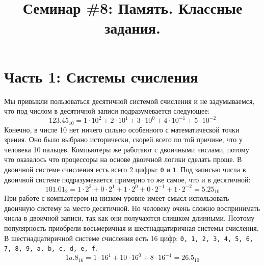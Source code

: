 \documentclass{article}
\begin{document}
\newpage

\title{Семинар \#8: Память. Классные задания.\vspace{-5ex}}\date{}\maketitle
\section*{Часть 1: Системы счисления}
Мы привыкли пользоваться десятичной системой счисления и не задумываемся, что под числом в десятичной записи подразумевается следующее:
$$
123.45_{10} = 1 \cdot 10^2 + 2 \cdot 10^1 + 3 \cdot 10^0 + 4 \cdot 10^{-1} + 5 \cdot 10^{-2}
$$
Конечно, в числе 10 нет ничего сильно особенного с математической точки зрения. Оно было выбрано исторически, скорей всего по той причине, что у человека 10 пальцев. Компьютеры же работают с двоичными числами, потому что оказалось что процессоры на основе двоичной логики сделать проще. В двоичной системе счисления есть всего 2 цифры: \texttt{0} и \texttt{1}. Под записью числа в двоичной системе подразумевается примерно то же самое, что и в десятичной:
$$
101.01_2 = 1 \cdot 2^2 + 0 \cdot 2^1 + 1 \cdot 2^0 + 0 \cdot 2^{-1} + 1 \cdot 2^{-2} = 5.25_{10}
$$
При работе с компьютером на низком уровне имеет смысл использовать двоичную систему за место десятичной.  Но человеку очень сложно воспринимать числа в двоичной записи, так как они получаются слишком длинными. Поэтому популярность приобрели восьмеричная и шестнадцатиричная системы счисления. В шестнадцатиричной системе счисления есть 16 цифр: \texttt{0, 1, 2, 3, 4, 5, 6, 7, 8, 9, a, b, c, d, e, f}.
$$
1a.8_{16} = 1 \cdot 16^1 + 10 \cdot 16^0 + 8 \cdot 16^{-1} = 26.5_{10}
$$
\end{document}
